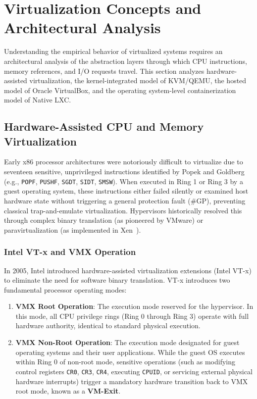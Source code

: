 \section{Virtualization Concepts and Architectural Analysis}
\label{sec:virtualization_concepts}

Understanding the empirical behavior of virtualized systems requires an architectural analysis of the abstraction layers through which CPU instructions, memory references, and I/O requests travel. This section analyzes hardware-assisted virtualization, the kernel-integrated model of KVM/QEMU, the hosted model of Oracle VirtualBox, and the operating system-level containerization model of Native LXC.

\subsection{Hardware-Assisted CPU and Memory Virtualization}
\label{subsec:hardware_assisted_virt}

Early x86 processor architectures were notoriously difficult to virtualize due to seventeen sensitive, unprivileged instructions identified by Popek and Goldberg~\cite{adams2006comparison} (e.g., \texttt{POPF}, \texttt{PUSHF}, \texttt{SGDT}, \texttt{SIDT}, \texttt{SMSW}). When executed in Ring 1 or Ring 3 by a guest operating system, these instructions either failed silently or examined host hardware state without triggering a general protection fault (\#GP), preventing classical trap-and-emulate virtualization. Hypervisors historically resolved this through complex binary translation (as pioneered by VMware) or paravirtualization (as implemented in Xen~\cite{barham2003xen}).

\subsubsection{Intel VT-x and VMX Operation}
In 2005, Intel introduced hardware-assisted virtualization extensions (Intel VT-x) to eliminate the need for software binary translation. VT-x introduces two fundamental processor operating modes:
\begin{enumerate}
    \item \textbf{VMX Root Operation}: The execution mode reserved for the hypervisor. In this mode, all CPU privilege rings (Ring 0 through Ring 3) operate with full hardware authority, identical to standard physical execution.
    \item \textbf{VMX Non-Root Operation}: The execution mode designated for guest operating systems and their user applications. While the guest OS executes within Ring 0 of non-root mode, sensitive operations (such as modifying control registers \texttt{CR0}, \texttt{CR3}, \texttt{CR4}, executing \texttt{CPUID}, or servicing external physical hardware interrupts) trigger a mandatory hardware transition back to VMX root mode, known as a \textbf{VM-Exit}.
\end{enumerate}

